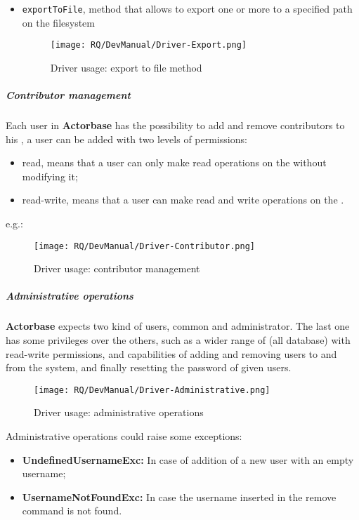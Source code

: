 \documentclass{scalatekids-article}
\begin{document}
\begin{itemize}
\item \verb=exportToFile=, method that allows to export one or more  to a specified path on the filesystem
  \begin{figure}[H]
    \begin{center}
      \texttt{[image: RQ/DevManual/Driver-Export.png]}
      \caption{Driver usage: export to file method}
    \end{center}
  \end{figure}
\end{itemize}

\subparagraph{Contributor management}

Each user in \textbf{Actorbase} has the possibility to add and remove contributors
to his , a user can be added with two levels of permissions:
\begin{itemize}
\item read, means that a user can only make read operations on the  without modifying it;
\item read-write, means that a user can make read and write operations on the .
\end{itemize}
e.g.:
\begin{figure}[H]
  \begin{center}
    \texttt{[image: RQ/DevManual/Driver-Contributor.png]}
    \caption{Driver usage: contributor management}
  \end{center}
\end{figure}

\subparagraph{Administrative operations}

\textbf{Actorbase} expects two kind of users, common and administrator. The last one has
some privileges over the others, such as a wider range of  (all
database) with read-write permissions, and capabilities of adding and removing
users to and from the system, and finally resetting the password of given users.
\begin{figure}[H]
  \begin{center}
    \texttt{[image: RQ/DevManual/Driver-Administrative.png]}
    \caption{Driver usage: administrative operations}
  \end{center}
\end{figure}
Administrative operations could raise some exceptions:
\begin{itemize}
\item \textbf{UndefinedUsernameExc:} In case of addition of a new user with an empty username;
\item \textbf{UsernameNotFoundExc:} In case the username inserted in the remove command is not found.
\end{itemize}
\end{document}
